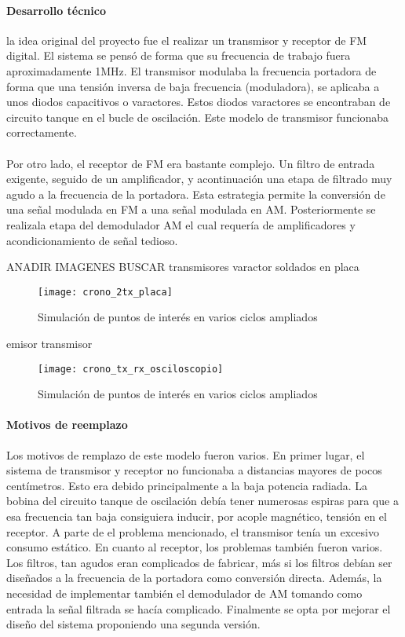 \paragraph{Desarrollo técnico}
la idea original del proyecto fue el realizar un transmisor y receptor de FM digital. El sistema se pensó de forma que su frecuencia de trabajo fuera aproximadamente 1MHz. 
El transmisor modulaba la frecuencia portadora de forma que una tensión inversa de baja frecuencia (moduladora), se aplicaba a unos diodos capacitivos o varactores. Estos diodos varactores se encontraban de circuito tanque en el bucle de oscilación.
Este modelo de transmisor funcionaba correctamente.

\paragraph{}
Por otro lado, el receptor de FM era bastante complejo. Un filtro de entrada exigente, seguido de un amplificador, y acontinuación una etapa de filtrado muy agudo a la frecuencia de la portadora. Esta estrategia permite la conversión de una señal modulada en FM a una señal modulada en AM. Posteriormente se realizala etapa del demodulador AM el cual requería de amplificadores y acondicionamiento de señal tedioso.  

ANADIR IMAGENES BUSCAR
transmisores varactor soldados en placa
\begin{figure}[h]
    \centering
    \texttt{[image: crono\_2tx\_placa]}
    \caption{Simulación de puntos de interés en varios ciclos ampliados}
    \label{fig:simrx_zoom}
\end{figure}

emisor transmisor 
\begin{figure}[h]
    \centering
    \texttt{[image: crono\_tx\_rx\_osciloscopio]}
    \caption{Simulación de puntos de interés en varios ciclos ampliados}
    \label{fig:simrx_zoom}
\end{figure}

\paragraph{Motivos de reemplazo}
Los motivos de remplazo de este modelo fueron varios.
En primer lugar, el sistema de transmisor y receptor no funcionaba a distancias mayores de pocos centímetros. Esto era debido principalmente a la baja potencia radiada. La bobina del circuito tanque de oscilación debía tener numerosas espiras para que a esa frecuencia tan baja consiguiera inducir, por acople magnético, tensión en el receptor.
A parte de el problema mencionado, el transmisor tenía un excesivo consumo estático. En cuanto al receptor, los problemas también fueron varios. Los filtros, tan agudos eran complicados de fabricar, más si los filtros debían ser diseñados a la frecuencia de la portadora como conversión directa. Además, la necesidad de implementar también el demodulador de AM tomando como entrada la señal filtrada se hacía complicado.
Finalmente se opta por mejorar el diseño del sistema proponiendo una segunda versión.
